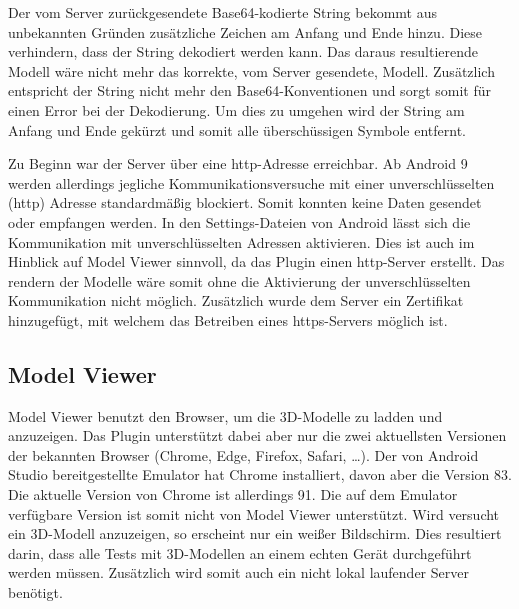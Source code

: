 Der vom Server zurückgesendete Base64-kodierte String bekommt aus unbekannten Gründen zusätzliche Zeichen am Anfang und Ende hinzu. Diese verhindern, dass der String dekodiert 
werden kann. Das daraus resultierende Modell wäre nicht mehr das korrekte, vom Server gesendete, Modell. Zusätzlich entspricht der String nicht mehr den Base64-Konventionen und 
sorgt somit für einen Error bei der Dekodierung. \newline
Um dies zu umgehen wird der String am Anfang und Ende gekürzt und somit alle überschüssigen Symbole entfernt.

Zu Beginn war der Server über eine http-Adresse erreichbar. Ab Android 9 werden allerdings jegliche Kommunikationsversuche mit einer unverschlüsselten (http) Adresse standardmäßig 
blockiert. Somit konnten keine Daten gesendet oder empfangen werden. \newline
In den Settings-Dateien von Android lässt sich die Kommunikation mit unverschlüsselten Adressen aktivieren. Dies ist auch im Hinblick auf Model Viewer sinnvoll, da das Plugin einen 
http-Server erstellt. Das rendern der Modelle wäre somit ohne die Aktivierung der unverschlüsselten Kommunikation nicht möglich. \newline
Zusätzlich wurde dem Server ein Zertifikat hinzugefügt, mit welchem das Betreiben eines https-Servers möglich ist.

\subsection{Model Viewer}

Model Viewer benutzt den Browser, um die 3D-Modelle zu ladden und anzuzeigen. Das Plugin unterstützt dabei aber nur die zwei aktuellsten Versionen der bekannten Browser 
(Chrome, Edge, Firefox, Safari, \dots). Der von Android Studio bereitgestellte Emulator hat Chrome installiert, davon aber die Version 83. Die aktuelle Version von Chrome ist allerdings 
91. Die auf dem Emulator verfügbare Version ist somit nicht von Model Viewer unterstützt. Wird versucht ein 3D-Modell anzuzeigen, so erscheint nur ein weißer Bildschirm. \newline
Dies resultiert darin, dass alle Tests mit 3D-Modellen an einem echten Gerät durchgeführt werden müssen. Zusätzlich wird somit auch ein nicht lokal laufender Server benötigt.